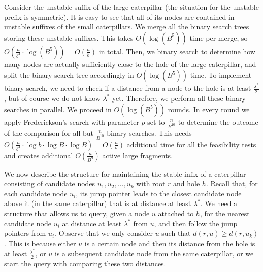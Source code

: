\documentclass[a4paper,UKenglish]{lipics-v2016}
\theoremstyle{plain}
\begin{document}
\medskip {}
Consider the unstable suffix of the large caterpillar (the situation for the unstable prefix is
symmetric). It is easy to see that all of its nodes are contained in unstable suffixes of
the small caterpillars. We merge all the binary search trees storing these unstable suffixes.
This takes $O(\log (B^5))$ time per merge, so $O(\frac{n}{b^{4}}\cdot \log (B^5))=O(\frac{n}{b})$ in total.
Then, we binary search to determine how many nodes are actually sufficiently close to the hole of the large caterpillar, and
 split the binary search tree accordingly in $O(\log (B^{5}))$ time. To implement binary search, we need to
check if a distance from a node to the hole is at least $\frac{\lambda^{*}}{2}$, but of course we
do not know $\lambda^{*}$ yet. Therefore, we perform all these binary searches in parallel. We proceed in $O(\log (B^{5}))$ rounds. In every round we apply Frederickson's search
with parameter $p$ set to $\frac{n}{B^{10}}$ to determine  the outcome of the comparison for all
but $\frac{n}{B^{10}}$ binary searches. This needs
$O(\frac{n}{b^{4}}\cdot\log b\cdot\log B\cdot\log B)=O(\frac{n}{b})$ additional time for
all the feasibility tests and creates additional $O(\frac{n}{B^{9}})$ active large fragments.

\medskip {}
We now describe the structure for maintaining the stable infix of a caterpillar consisting of candidate nodes $u_{1},u_{2},\ldots,u_{k}$ with root $r$ and hole $h$. 
Recall that, for each candidate node $u_i$, its jump pointer leads to the closest candidate node above it (in the same caterpillar) that is at distance at least $\lambda ^*$. 
We need a structure that allows us to query, given a node $u$ attached to $h$, for the nearest candidate node $u_{i}$ at distance at least $\lambda^{*}$ from $u$, and then follow the jump pointers from $u_{i}$.
%
Observe that we only consider $u$ such that $d(r,u)\geq d(r,u_{k})$. This is because either $u$ is a certain node and then its distance from the hole is at least
$\frac{\lambda^{*}}{2}$, or $u$ is a subsequent candidate node from the same caterpillar,
or we start the query with comparing these two distances.
\end{document}
